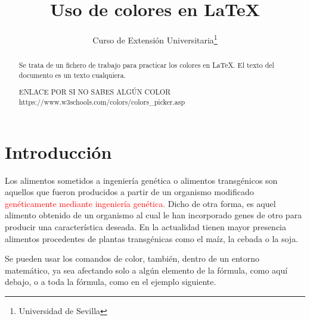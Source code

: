\documentclass[11pt,twoside]{article}
\title{Uso de colores en \LaTeX}
\author{Curso de Extensión Universitaria\thanks{Universidad de Sevilla}}
\date{}
\begin{document}
\maketitle





\begin{abstract}
Se trata de un fichero de trabajo para practicar los colores en \LaTeX. El texto del documento es un texto cualquiera. 

\bigskip

{\Huge ENLACE POR SI NO SABES ALGÚN COLOR }\\[10pt]{\Large https://www.w3schools.com/colors/colors\_picker.asp}
\end{abstract}





\tableofcontents





\section{Introducción}



Los alimentos sometidos a ingeniería genética o alimentos transgénicos son aquellos que fueron producidos a partir de un organismo modificado
\textcolor{Red}{genéticamente mediante ingeniería genética.} 
Dicho de otra forma, es aquel alimento obtenido de un organismo al cual le han incorporado genes de otro para producir una característica deseada.
\textcolor{ProcessBlue}{En la actualidad tienen mayor presencia} alimentos procedentes de plantas transgénicas como el maíz, la cebada o la soja.





\bigskip
Se pueden usar los comandos de color, también, dentro de un entorno matemático, ya sea afectando solo a algún elemento de la fórmula, como aquí debajo, o a toda la fórmula, como en el ejemplo siguiente.
\end{document}
